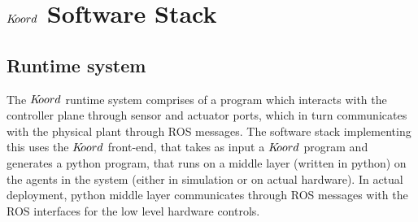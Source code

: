 \section{$K\kern-2pt oord$ Software Stack}
\label{sec:verif}

\subsection{Runtime system}
 The $K\kern-2pt oord$ runtime system comprises of a program which interacts with the controller plane through sensor and actuator ports, which in turn communicates with the physical plant through ROS messages. The software stack implementing this uses the $K\kern-2pt oord$ front-end, that takes as input a $K\kern-2pt oord$ program and generates a python program, that runs on a middle layer (written in python) on the agents in the system (either in simulation or on actual hardware). In actual deployment, python middle layer communicates through ROS messages with the ROS interfaces for the low level hardware controls. 

